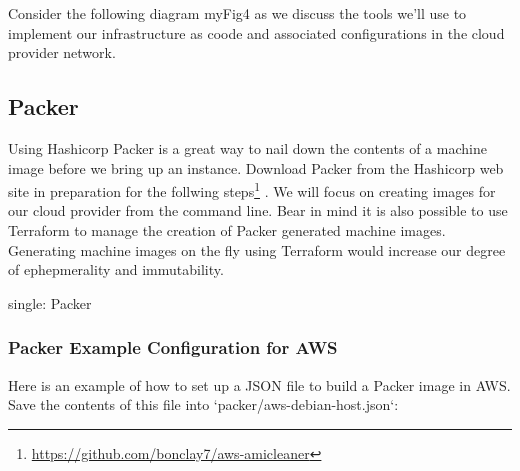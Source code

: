 Consider the following diagram {myFig4} as we discuss the tools we'll
use to implement our infrastructure as coode and associated
configurations in the cloud provider network.

\hypertarget{packer}{%
\subsection{Packer}\label{packer}}

Using Hashicorp Packer is a great way to nail down the contents of a
machine image before we bring up an instance. Download Packer from the
Hashicorp web site in preparation for the follwing steps\footnote{\url{https://github.com/bonclay7/aws-amicleaner}}
. We will focus on creating images for our cloud provider from the
command line. Bear in mind it is also possible to use Terraform to
manage the creation of Packer generated machine images. Generating
machine images on the fly using Terraform would increase our degree of
ephepmerality and immutability.

single: Packer

\hypertarget{packer-example-configuration-for-aws}{%
\subsubsection{Packer Example Configuration for
AWS}\label{packer-example-configuration-for-aws}}

Here is an example of how to set up a JSON file to build a Packer image
in AWS. Save the contents of this file into
`packer/aws-debian-host.json`:

